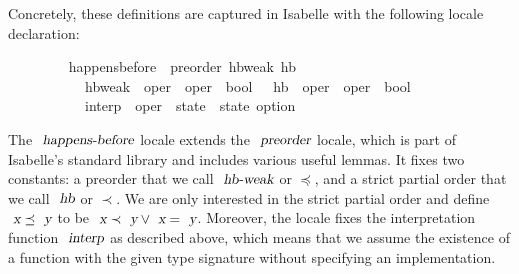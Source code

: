 Concretely, these definitions are captured in Isabelle with the following locale declaration:
\vspace{0.25em}
\begin{isabellebody}
\ \ \ \ \ \ \ \  happens{\isacharunderscore}before\ {\isacharequal}\ preorder\ hb{\isacharunderscore}weak\ hb\isanewline
\ \ \ \ \ \ \ \ \ \ \ hb{\isacharunderscore}weak\ {\isacharcolon}{\isacharcolon}\ {\isachardoublequoteopen}{\isacharprime}oper\ {\isasymRightarrow}\ {\isacharprime}oper\ {\isasymRightarrow}\ bool{\isachardoublequoteclose}\ \ \ hb\ {\isacharcolon}{\isacharcolon}\ {\isachardoublequoteopen}{\isacharprime}oper\ {\isasymRightarrow}\ {\isacharprime}oper\ {\isasymRightarrow}\ bool{\isachardoublequoteclose}\ {\isacharplus}\isanewline
\ \ \ \ \ \ \ \ \ \ \ interp\ {\isacharcolon}{\isacharcolon}\ {\isachardoublequoteopen}{\isacharprime}oper\ {\isasymRightarrow}\ {\isacharprime}state\ {\isasymRightarrow}\ {\isacharprime}state\ option{\isachardoublequoteclose}
\end{isabellebody}
\vspace{0.25em}
The $\isa{happens-before}$ locale extends the $\isa{preorder}$ locale, which is part of Isabelle's standard library and includes various useful lemmas.
It fixes two constants: a preorder that we call $\isa{hb-weak}$ or $\preceq$, and a strict partial order that we call $\isa{hb}$ or $\prec$.
We are only interested in the strict partial order and define $\isa{x}\preceq\isa{y}$ to be $\isa{x}\prec\isa{y} \vee \isa{x}=\isa{y}$.
Moreover, the locale fixes the interpretation function $\isa{interp}$ as described above, which means that we assume the existence of a function with the given type signature without specifying an implementation.

